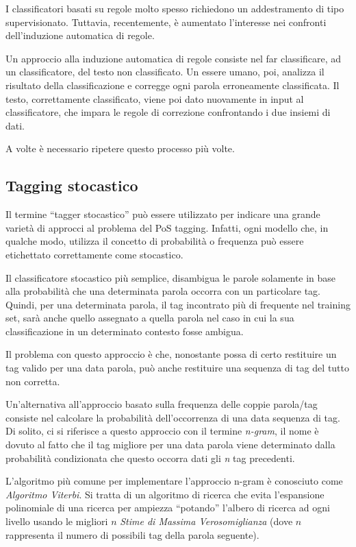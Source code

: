 I classificatori basati su regole molto spesso richiedono un addestramento di
tipo supervisionato. Tuttavia, recentemente, \`e aumentato l'interesse nei
confronti dell'induzione automatica di regole.

Un approccio alla induzione automatica di regole consiste nel far classificare,
ad un classificatore, del testo non classificato. Un essere umano, poi, analizza
il risultato della classificazione e corregge ogni parola erroneamente classificata.
Il testo, correttamente classificato, viene poi dato nuovamente in input al
classificatore, che impara le regole di correzione confrontando i due insiemi di
dati.

A volte \`e necessario ripetere questo processo pi\`u volte.

\subsection{Tagging stocastico}

Il termine ``tagger stocastico'' pu\`o essere utilizzato per indicare una grande
variet\`a di approcci al problema del PoS tagging. Infatti, ogni modello che, in
qualche modo, utilizza il concetto di probabilit\`a o frequenza pu\`o essere
etichettato correttamente come stocastico.

Il classificatore stocastico pi\`u semplice, disambigua le parole solamente in
base alla probabilit\`a che una determinata parola occorra con un particolare tag.
Quindi, per una determinata parola, il tag incontrato pi\`u di frequente nel
training set, sar\`a anche quello assegnato a quella parola nel caso in cui la
sua classificazione in un determinato contesto fosse ambigua.

Il problema con questo approccio \`e che, nonostante possa di certo restituire
un tag valido per una data parola, pu\`o anche restituire una sequenza di tag del
tutto non corretta.

Un'alternativa all'approccio basato sulla frequenza delle coppie parola/tag
consiste nel calcolare la probabilit\`a dell'occorrenza di una data sequenza di
tag. Di solito, ci si riferisce a questo approccio con il termine \emph{n-gram},
il nome \`e dovuto al fatto che il tag migliore per una data parola viene
determinato dalla probabilit\`a condizionata che questo occorra dati gli \emph{n}
tag precedenti.

L'algoritmo pi\`u comune per implementare l'approccio n-gram \`e conosciuto come
\emph{Algoritmo Viterbi}. Si tratta di un algoritmo di ricerca che evita
l'espansione polinomiale di una ricerca per ampiezza ``potando'' l'albero di
ricerca ad ogni livello usando le migliori $n$ \emph{Stime di Massima Verosomiglianza}
(dove $n$ rappresenta il numero di possibili tag della parola seguente).

